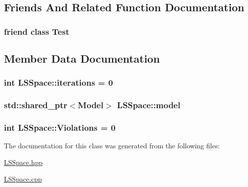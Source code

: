 \subsection{Friends And Related Function Documentation}
\hypertarget{class_l_s_space_a5b78b1c2e1fa07ffed92da365593eaa4}{
\subsubsection[{Test}]{\setlength{\rightskip}{0pt plus 5cm}friend class Test\hspace{0.3cm}{\ttfamily [friend]}}}\label{class_l_s_space_a5b78b1c2e1fa07ffed92da365593eaa4}


\subsection{Member Data Documentation}
\hypertarget{class_l_s_space_acfd6b86c42c63f43a29bee6853a2992e}{
\subsubsection[{iterations}]{\setlength{\rightskip}{0pt plus 5cm}int L\-S\-Space\-::iterations = 0\hspace{0.3cm}{\ttfamily [private]}}}\label{class_l_s_space_acfd6b86c42c63f43a29bee6853a2992e}
\hypertarget{class_l_s_space_a3d1e22bec1da147a2ef457ead60d7d4f}{
\subsubsection[{model}]{\setlength{\rightskip}{0pt plus 5cm}std\-::shared\-\_\-ptr$<${\bf Model}$>$ L\-S\-Space\-::model\hspace{0.3cm}{\ttfamily [private]}}}\label{class_l_s_space_a3d1e22bec1da147a2ef457ead60d7d4f}
\hypertarget{class_l_s_space_a6f9048fcca7d13ce4394154af5ba0ed2}{
\subsubsection[{Violations}]{\setlength{\rightskip}{0pt plus 5cm}int L\-S\-Space\-::\-Violations = 0\hspace{0.3cm}{\ttfamily [private]}}}\label{class_l_s_space_a6f9048fcca7d13ce4394154af5ba0ed2}


The documentation for this class was generated from the following files\-:\begin{DoxyCompactItemize}
\item 
\hyperlink{_l_s_space_8hpp}{L\-S\-Space.\-hpp}\item 
\hyperlink{_l_s_space_8cpp}{L\-S\-Space.\-cpp}\end{DoxyCompactItemize}
